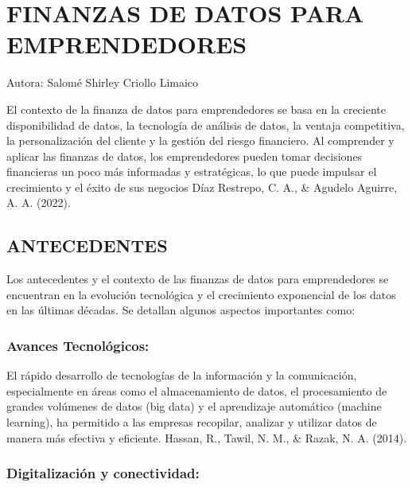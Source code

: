 \documentclass[
  letterpaper,
  DIV=11,
  numbers=noendperiod]{scrreprt}
\begin{document}

\hypertarget{finanzas-de-datos-para-emprendedores}{%
\chapter{FINANZAS DE DATOS PARA
EMPRENDEDORES}\label{finanzas-de-datos-para-emprendedores}}

Autora: Salomé Shirley Criollo Limaico

El contexto de la finanza de datos para emprendedores se basa en la
creciente disponibilidad de datos, la tecnología de análisis de datos,
la ventaja competitiva, la personalización del cliente y la gestión del
riesgo financiero. Al comprender y aplicar las finanzas de datos, los
emprendedores pueden tomar decisiones financieras un poco más informadas
y estratégicas, lo que puede impulsar el crecimiento y el éxito de sus
negocios Díaz Restrepo, C. A., \& Agudelo Aguirre, A. A. (2022).

\hypertarget{antecedentes}{%
\section{ANTECEDENTES}\label{antecedentes}}

Los antecedentes y el contexto de las finanzas de datos para
emprendedores se encuentran en la evolución tecnológica y el crecimiento
exponencial de los datos en las últimas décadas. Se detallan algunos
aspectos importantes como:

\hypertarget{avances-tecnoluxf3gicos}{%
\subsection{Avances Tecnológicos:}\label{avances-tecnoluxf3gicos}}

El rápido desarrollo de tecnologías de la información y la comunicación,
especialmente en áreas como el almacenamiento de datos, el procesamiento
de grandes volúmenes de datos (big data) y el aprendizaje automático
(machine learning), ha permitido a las empresas recopilar, analizar y
utilizar datos de manera más efectiva y eficiente. Hassan, R., Tawil, N.
M., \& Razak, N. A. (2014).

\hypertarget{digitalizaciuxf3n-y-conectividad}{%
\subsection{Digitalización y
conectividad:}\label{digitalizaciuxf3n-y-conectividad}}
\end{document}
